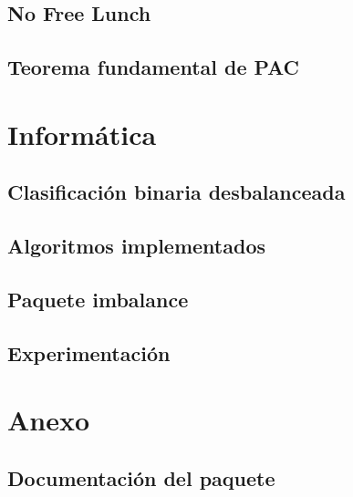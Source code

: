 \documentclass[oneside,openany,titlepage,dottedtoc,headinclude,%
               footinclude=true,cleardoublepage=empty,abstractoff, %
               paper=a4,fontsize=11pt,%
               ]{scrreprt}
\begin{document}
  \chapter{No Free Lunch}
    
  \chapter{Teorema fundamental de PAC}
    
  
\part{Informática}
  \chapter{Clasificación binaria desbalanceada}
    
  \chapter{Algoritmos implementados}
    
    
    
    
    
  \chapter{Paquete imbalance}
    
   \chapter{Experimentación}
    

\appendix
\part*{Anexo}
  \chapter{Documentación del paquete}
    


\end{document}
